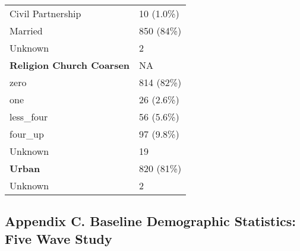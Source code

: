 \documentclass[
  single column]{article}
\begin{document}
\begin{longtable}[]{@{}ll@{}}
Civil Partnership & 10 (1.0\%) \\
Married & 850 (84\%) \\
Unknown & 2 \\
\textbf{Religion Church Coarsen} & NA \\
zero & 814 (82\%) \\
one & 26 (2.6\%) \\
less\_four & 56 (5.6\%) \\
four\_up & 97 (9.8\%) \\
Unknown & 19 \\
\textbf{Urban} & 820 (81\%) \\
Unknown & 2 \\

\end{longtable}

\newpage{}

\subsection{Appendix C. Baseline Demographic Statistics: Five Wave
Study}\label{appendix-demographics-long}
\end{document}

